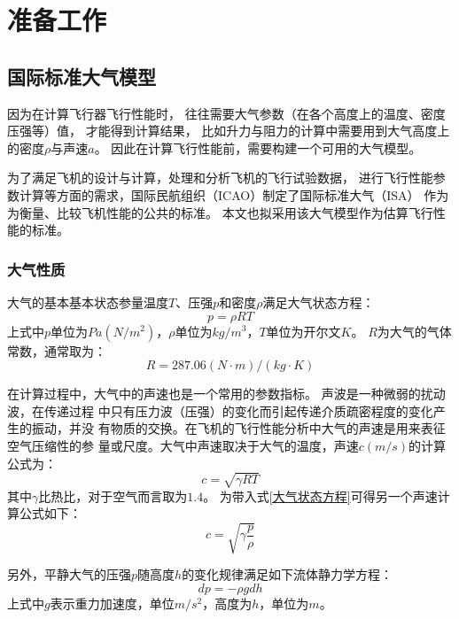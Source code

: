 \section{准备工作}

\subsection{国际标准大气模型}

因为在计算飞行器飞行性能时，
往往需要大气参数（在各个高度上的温度、密度压强等）值，
才能得到计算结果，
比如升力与阻力的计算中需要用到大气高度上的密度$\rho$与声速$a$。
因此在计算飞行性能前，需要构建一个可用的大气模型。

为了满足飞机的设计与计算，处理和分析飞机的飞行试验数据，
进行飞行性能参数计算等方面的需求，国际民航组织（ICAO）制定了国际标准大气（ISA）
作为为衡量、比较飞机性能的公共的标准。
本文也拟采用该大气模型作为估算飞行性能的标准。

\subsubsection{大气性质}

大气的基本基本状态参量温度$T$、压强$p$和密度$\rho$满足大气状态方程：
\begin{equation}
    \label{大气状态方程}
    p=\rho RT
\end{equation}
上式中$p$单位为$Pa(N/m^2)$，$\rho$单位为$kg/m^3$，$T$单位为开尔文$K$。
$R$为大气的气体常数，通常取为：
\begin{equation}
    R=287.06 (N\cdot m)/(kg\cdot K)
\end{equation}

在计算过程中，大气中的声速也是一个常用的参数指标。
声波是一种微弱的扰动波，在传递过程
中只有压力波（压强）的变化而引起传递介质疏密程度的变化产生的振动，并没
有物质的交换。在飞机的飞行性能分析中大气的声速是用来表征空气压缩性的参
量或尺度。大气中声速取决于大气的温度，声速$c(m/s)$的计算公式为：
\begin{equation}
    \label{声速计算公式}
    c = \sqrt{\gamma RT}
\end{equation}
其中$\gamma$比热比，对于空气而言取为$1.4$。
为带入式\ref{大气状态方程}可得另一个声速计算公式如下：
\begin{equation}
    \label{声速计算公式2}
    c = \sqrt{\gamma\frac{p}{\rho}}
\end{equation}

另外，平静大气的压强$p$随高度$h$的变化规律满足如下流体静力学方程：
\begin{equation}
    \label{流体静力学方程}
    dp = -\rho g dh
\end{equation}
上式中$g$表示重力加速度，单位$m/s^2$，高度为$h$，单位为$m$。

